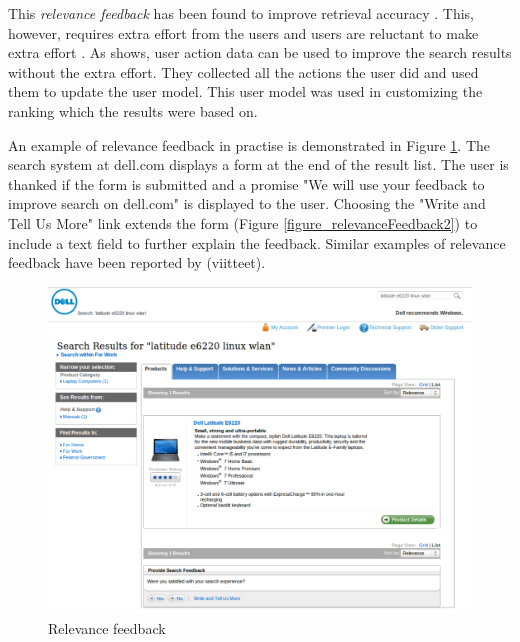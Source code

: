 \documentclass{sigchi}
\begin{document}
This \emph{relevance feedback} has been found to improve retrieval accuracy \cite{salton90}. This, however, requires extra effort from the users and users are reluctant to make extra effort \cite{kelly03}. As \cite{shen05} shows, user action data can be used to improve the search results without the extra effort. They collected all the actions the user did and used them to update the user model. This user model was used in customizing the ranking which the results were based on.

An example of relevance feedback in practise is demonstrated in Figure \ref{figure_relevanceFeedback1}.
The search system at dell.com displays a form at the end of the result list.
The user is thanked if the form is submitted and a promise "We will use your feedback to improve search on dell.com" is displayed to the user.
Choosing the "Write and Tell Us More" link extends the form (Figure \ref{figure_relevanceFeedback2}) to include a text field to further explain the feedback.
Similar examples of relevance feedback have been reported by (viitteet).

\begin{figure}[htp] %
\caption{Relevance feedback \protect} \label{figure_relevanceFeedback1}
\includegraphics[scale=0.28]{figures/relevanceFeedback1.pdf} 
\end{figure}
\end{document}
